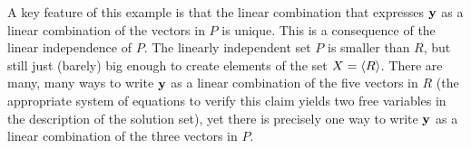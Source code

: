 \documentclass{ximera}
\begin{document}
\begin{example}
\begin{question}
\begin{feedback}[correct]
      A key feature of this example is that the linear combination that
      expresses $\mathbf{y}$ as a linear combination of the vectors in $P$
      is unique.  This is a consequence of the linear independence of $P$.
      The linearly independent set $P$ is smaller than $R$, but still just
      (barely) big enough to create elements of the set $X=\left\langle R\right\rangle$.
      There are many, many ways to write $\mathbf{y}$ as a linear
      combination of the five vectors in $R$ (the appropriate system of
      equations to verify this claim yields two free variables in the
      description of the solution set), yet there is precisely one way to
      write $\mathbf{y}$ as a linear combination of the three vectors in
      $P$.
    \end{feedback}
  \end{question}
\end{example}
\end{document}
